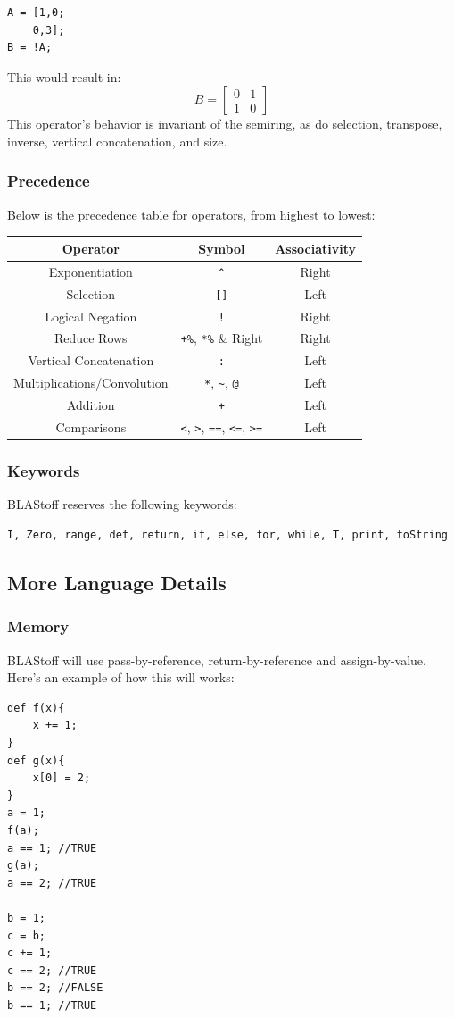 \begin{lstlisting}
A = [1,0;
    0,3];
B = !A;
\end{lstlisting}
This would result in:
$$B=\begin{bmatrix}
0 & 1\\
1 & 0
\end{bmatrix}$$
This operator's behavior is invariant of the semiring, as do selection, transpose, inverse, vertical concatenation, and size.

\subsubsection{Precedence}
Below is the precedence table for operators, from highest to lowest:
\begin{center}
\begin{tabular}{|c|c|c|}
    \hline
    Operator &  Symbol & Associativity\\
    \hline
    Exponentiation & \verb|^| & Right\\
    \hline
    Selection & \verb|[]| & Left\\
    \hline
    Logical Negation & \verb|!| & Right\\
    \hline
    Reduce Rows & \verb|+%|, \verb|*%| & Right\\
    \hline
    Vertical Concatenation & \verb|:| & Left\\
    \hline
    Multiplications/Convolution &  \verb|*|, \verb|~|, \verb|@| & Left\\
    \hline
    Addition &  \verb|+| & Left\\
    \hline
    Comparisons &  \verb|<|, \verb|>|, \verb|==|, \verb|<=|, \verb|>=|  & Left\\
    \hline
\end{tabular}
\end{center}

\subsubsection{Keywords}
BLAStoff reserves the following keywords:
\begin{verbatim}
I, Zero, range, def, return, if, else, for, while, T, print, toString
\end{verbatim}

\subsection{More Language Details}
\subsubsection{Memory}
BLAStoff will use pass-by-reference, return-by-reference and assign-by-value.  Here's an example of how this will works:
\begin{lstlisting}
def f(x){
    x += 1;
}
def g(x){
    x[0] = 2;
}
a = 1;
f(a);
a == 1; //TRUE
g(a);
a == 2; //TRUE

b = 1;
c = b;
c += 1;
c == 2; //TRUE
b == 2; //FALSE
b == 1; //TRUE
\end{lstlisting}

